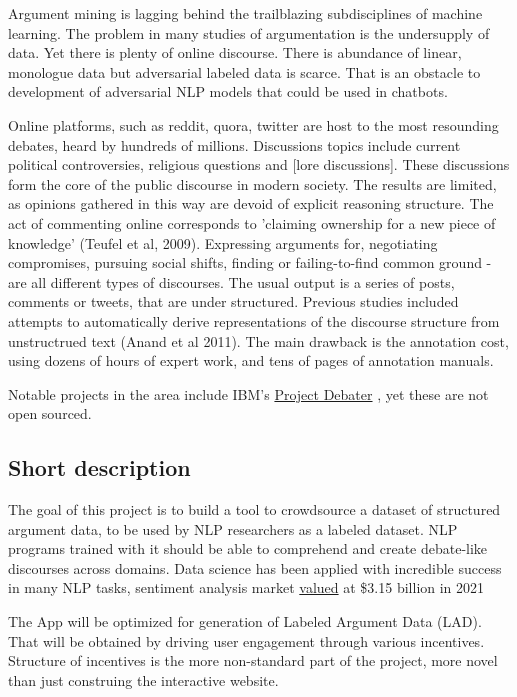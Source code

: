 \documentclass{article}
\begin{document}
Argument mining is lagging behind the trailblazing subdisciplines of machine learning. The problem in many studies of argumentation is the undersupply of data. Yet there is plenty of online discourse.
There is abundance of linear, monologue data but adversarial labeled data is scarce. That is an obstacle to development of adversarial NLP models that could be used in chatbots. 

Online platforms, such as reddit, quora, twitter are host to the most resounding debates, heard by hundreds of millions.  Discussions topics include current political controversies, religious questions and [lore discussions]. These discussions form the core of the public discourse in modern society.  The results are limited, as opinions gathered in this way are devoid of explicit reasoning structure.  The act of commenting online corresponds to 'claiming ownership for a new piece of knowledge' (Teufel et al, 2009). Expressing arguments for, negotiating compromises, pursuing social shifts, finding or failing-to-find common ground - are all different types of discourses. The usual output is a series of posts, comments or tweets, that are under structured. 
Previous studies included attempts to automatically derive representations of the discourse structure from unstructrued text (Anand et al 2011).
The main drawback is the annotation cost, using dozens of hours of expert work, and tens of pages of annotation manuals.

Notable projects in the area include IBM's \href{https://research.ibm.com/interactive/project-debater/}{Project Debater} \cite{slonim2021autonomous}, yet these are not open sourced.

\subsection{Short description}
The goal of this project is to build a tool to crowdsource a dataset of structured argument data, to be used by NLP researchers as a labeled dataset.
NLP programs trained with it should be able to comprehend and create debate-like discourses across domains.
Data science has been applied with incredible success in many NLP tasks, sentiment analysis market \href{https://www.polarismarketresearch.com/industry-analysis/sentiment-analytics-market}{valued} at \$3.15 billion in 2021 

The App will be optimized for generation of Labeled Argument Data (LAD). That will be obtained by driving user engagement through various incentives. 
Structure of incentives is the more non-standard part of the project, more novel than just construing the interactive website.
\end{document}
